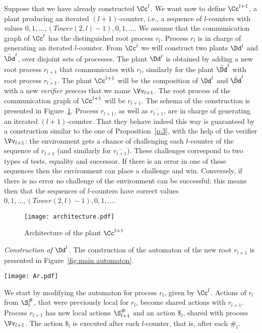 \documentclass{llncs}
\newcommand{\Tower}{\mathit{Tower}}
\begin{document}
Suppose that we have already constructed $\Cc^l$. We want now to
define $\Cc^{l+1}$, a plant producing an iterated $(l+1)$-counter,
i.e., a sequence of $l$-counters with values $0,1,\ldots, (\Tower(2,l)-1),
0,1, \ldots$. We assume that the
communication graph of $\Cc^l$ has the distinguished root process $r_l$. Process
$r_l$ is in charge of generating an iterated $l$-counter. From $\Cc^l$ we
will construct two plants $\Dd^l$ and $\bar \Dd^l$, over disjoint sets
of processes. The plant $\Dd^l$ is obtained by adding a new root
process $r_{l+1}$ that communicates with $r_l$, similarly for the 
plant $\bar \Dd^l$ with root process $\bar{r_{l+1}}$.  The plant
$\Cc^{l+1}$ will be the composition of $\Dd^l$ and $\bar \Dd^l$ with a new
\emph{verifier process} that we name $\Vv_{l+1}$. The root process of the communication graph
of $\Cc^{l+1}$ will be $r_{l+1}$. The schema of the
construction is presented in Figure~\ref{fig:architecture}. Process
$r_{l+1}$, as well as $\bar{r_{l+1}}$, are in charge of generating an
iterated $(l+1)$-counter. That they behave indeed this way is
guaranteed by a construction similar to the one of
Proposition~\ref{p:3}, with the help of the verifier $\Vv_{l+1}$:
 the
environment gets a chance of challenging each $l$-counter of the
sequence of $r_{l+1}$ (and similarly for $\bar{r_{l+1}}$). These
challenges correspond to two types of tests, equality and
successor. If there is an error in one of these sequences then 
the environment can place a challenge and win. Conversely, if there is
no error no challenge of the environment can be successful; this means
then that the sequences of $l$-counters have
correct values $0,1,\ldots,(\Tower(2,l)-1),0,1,\ldots$.

\begin{figure}[htbp]
  \centering
  \texttt{[image: architecture.pdf]}
  \caption{Architecture of the plant $\Cc^{l+1}$}
  \label{fig:architecture}
\end{figure}



\medskip\noindent\textit{Construction of $\Dd^l$.}
The construction of the automaton  of the new root
$r_{l+1}$ is presented in Figure~\ref{fig:main automaton}.

\begin{figure*}[htbp]
  \centering
  \texttt{[image: Ar.pdf]}
  \caption{Automaton for process $r_{l+1}$}
  \label{fig:main automaton}
\end{figure*}


We start by modifying the automaton for process $r_l$, given by $\Cc^l$.
Actions of $r_l$ from $\S^\#_l$, that were previously local for
$r_l$, become shared actions with $r_{l+1}$.  Process $r_{l+1}$ has new local actions 
$\S^\#_{l+1}$ and an action $\$_l$, shared with process $\Vv_{l+1}$. The action
$\$_l$ is executed after each $l$-counter, that is, after each $\#_l$.
\end{document}

